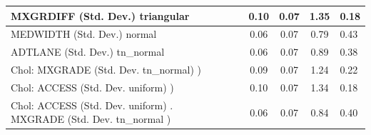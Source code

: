 \begin{table}
\begin{center}
\begin{tabular}{|l|l|c|c|c|l|}
			\hline
			MXGRDIFF (Std. Dev.) triangular &  & 0.10 & 0.07 & 1.35 & 0.18 \\
			\hline
			MEDWIDTH (Std. Dev.) normal &  & 0.06 & 0.07 & 0.79 & 0.43 \\
			\hline
			ADTLANE (Std. Dev.) tn_normal &  & 0.06 & 0.07 & 0.89 & 0.38 \\
			\hline
			 Chol: MXGRADE (Std. Dev. tn_normal) ) &  & 0.09 & 0.07 & 1.24 & 0.22 \\
			\hline
			 Chol: ACCESS (Std. Dev. uniform) ) &  & 0.10 & 0.07 & 1.34 & 0.18 \\
			\hline
			 Chol: ACCESS (Std. Dev. uniform) . MXGRADE (Std. Dev.   tn_normal ) &  & 0.06 & 0.07 & 0.84 & 0.40 \\
			\hline
		\end{tabular}
	\end{center}
\end{table}